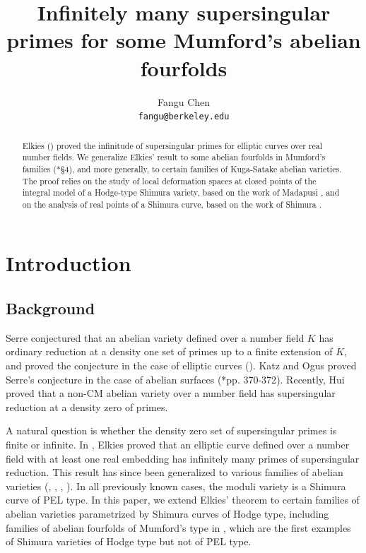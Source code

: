 \documentclass{amsart}
\numberwithin{equation}{subsection}
\numberwithin{theorem}{section}
\theoremstyle{definition}
\theoremstyle{remark}
\begin{document}
\title[]{Infinitely many supersingular primes for some Mumford's abelian fourfolds}

\author {Fangu Chen\\
\texttt{\lowercase{fangu@berkeley.edu}}}


\begin{abstract}
    Elkies (\cites{MR903384,MR1030140}) proved the infinitude of supersingular primes for elliptic curves over real number fields. We generalize Elkies' result to some abelian fourfolds in Mumford's families (\cite{MR248146}*{\S4}), and more generally,  to certain families of Kuga-Satake abelian varieties. The proof relies on the study of local deformation spaces at closed points of the integral model of a Hodge-type Shimura variety, based on the work of Madapusi \cite{MR3484114}, and on the analysis of real points of a Shimura curve, based on the work of Shimura \cite{MR572971}. 
\end{abstract}

\maketitle

\section{Introduction}

\subsection{Background}

Serre conjectured that an abelian variety defined over a number field $K$ has ordinary reduction at a density one set of primes up to a finite extension of $K$, and proved the conjecture in the case of elliptic curves (\cite{MR644559}). Katz and Ogus proved Serre’s conjecture in the case of abelian surfaces (\cite{MR654325}*{pp. 370-372}). Recently, Hui \cite{hui2025distributionsupersingularprimesabelian} proved that a non-CM abelian variety over a number field has supersingular reduction at a density zero of primes. 


A natural question is whether the density zero set of supersingular primes is finite or infinite. 
In \cites{MR903384,MR1030140}, Elkies proved that an elliptic curve defined over a number field with at least one real embedding has infinitely many primes of supersingular reduction. 
This result has since been generalized to various families of abelian varieties (\cite{MR2704678}, \cite{MR2705896}, \cite{MR2414789}, \cite{LMPT}). In all previously known cases, the moduli variety is a Shimura curve of PEL type.
In this paper, we extend Elkies’ theorem to certain families of abelian varieties parametrized by Shimura curves of Hodge type, including families of abelian fourfolds of Mumford’s type in \cite{MR248146}, which are the first examples of Shimura varieties of Hodge type but not of PEL type. 
\end{document}
